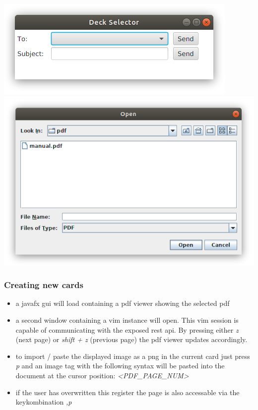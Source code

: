 \documentclass[xcolor=dvipanames]{beamer}
\begin{document}
	\begin{frame}
		\begin{center}
			\includegraphics[scale=.35]{./img/editProperties_deckSelection.png}
			\includegraphics[scale=.35]{./img/editProperties_pdfSelection.png}
		\end{center}
	\end{frame}
	
	
	\begin{frame}
		\frametitle{Creating new cards}
		\begin{itemize}
			\item a javafx gui will load containing a pdf viewer showing the selected pdf
			\item a second window containing a vim instance will open. This vim session is capable of communicating with the exposed rest api. By pressing either \emph{z} (next page) or \emph{shift + z} (previous page) the pdf viewer updates accordingly. 
			\item to import / paste the displayed image as a png in the current card just press \emph{p} and an image tag with the following syntax will be pasted into the document at the cursor position: \emph{<PDF_PAGE_NUM>}
			\item if the user has overwritten this register the page is also accessable via the keykombination \emph{,p}
		\end{itemize}
	\end{frame}
	
\end{document}
